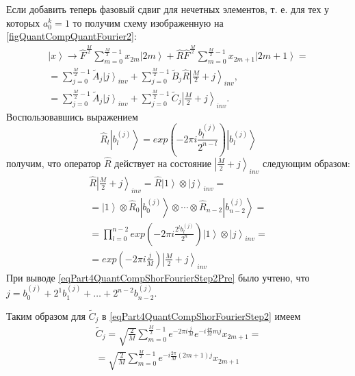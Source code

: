 

Если добавить теперь фазовый сдвиг для нечетных элементов, т. е. для
тех у которых $a_0^k = 1$ то получим схему изображенную на
\autoref{figQuantCompQuantFourier2}: 
\begin{eqnarray}
\left|x\right> \rightarrow
\hat{F}^{\frac{M}{2}} \sum_{m = 0}^{\frac{M}{2} - 1}x_{2m} \left|2m\right> +
\hat{R}\hat{F}^{\frac{M}{2}} \sum_{m = 0}^{\frac{M}{2} - 1} x_{2m + 1}
\left|2m+1\right> =
\nonumber \\
= 
\sum^{\frac{M}{2} - 1}_{j = 0} \tilde{A}_{j} \left|j\right>_{inv} +
\sum^{\frac{M}{2} - 1}_{j = 0}  
\tilde{B}_{j} \hat{R}\left|\frac{M}{2} + j\right>_{inv},
\nonumber \\
= 
\sum^{\frac{M}{2} - 1}_{j = 0}  \tilde{A}_{j} \left|j\right>_{inv} +
\sum^{\frac{M}{2} - 1}_{j = 0}  
\tilde{C}_{j} \left|\frac{M}{2} + j\right>_{inv}.
\label{eqPart4QuantCompShorFourierStep2}
\end{eqnarray}
Воспользовавшись выражением
\begin{equation}
\hat{R}_l \left|b^{(j)}_l\right> = 
exp{\left(- 2 \pi i \frac{b^{(j)}_l}{2^{n-l}}\right)}
\left|b^{(j)}_l\right>
\nonumber
\end{equation}
получим, что оператор $\hat{R}$ действует на состояние 
$\left|\frac{M}{2} + j\right>_{inv}$ следующим образом:
\begin{eqnarray}
\hat{R}\left|\frac{M}{2} + j\right>_{inv} = 
\hat{R}\left|1\right> \otimes  \left|j\right>_{inv} = 
\nonumber \\
= 
\left|1\right> \otimes \hat{R}_0 \left|b^{(j)}_0\right>
\otimes \cdots \otimes \hat{R}_{n-2} \left|b^{(j)}_{n-2}\right> = 
\nonumber \\
= 
\prod_{l = 0}^{n-2}exp{\left(- 2 \pi i \frac{2^lb^{(j)}_l}{2^n}\right)}
\left|1\right> \otimes \left|j\right>_{inv} = 
\nonumber \\
=
exp{\left(-2 \pi i \frac{j}{M}\right)}
\left|\frac{M}{2} + j\right>_{inv} 
\label{eqPart4QuantCompShorFourierStep2Pre}
\end{eqnarray}
При выводе \eqref{eqPart4QuantCompShorFourierStep2Pre} было учтено,
что $j = b^{(j)}_0 + 2^1 b^{(j)}_1 + \dots + 2^{n-2} b^{(j)}_{n-2}$. 

Таким образом для $\tilde{C}_{j}$ в 
\eqref{eqPart4QuantCompShorFourierStep2} имеем
\begin{eqnarray}
\tilde{C}_{j} = 
\sqrt{\frac{2}{M}} 
\sum_{m = 0}^{\frac{M}{2} - 1} 
e^{- 2 \pi i \frac{j}{M}}
e^{-i \frac{4 \pi}{M} m j} x_{2m+1} =
\nonumber \\
=
\sqrt{\frac{2}{M}} 
\sum_{m = 0}^{\frac{M}{2} - 1} 
e^{-i \frac{2 \pi}{M} \left(2m+1\right) j} x_{2m+1}
\label{eqPart4QuantCompShorC}
\end{eqnarray}

